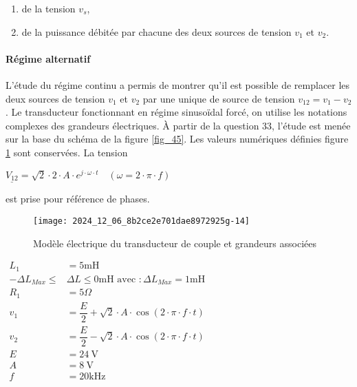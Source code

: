\begin{enumerate}
  \item de la tension \(v_{s}\),
  \item de la puissance débitée par chacune des deux sources de tension \(v_{1}\) et \(v_{2}\).
\end{enumerate}
\ifprof
\begin{corrige}

\end{corrige}
\else
\fi

\paragraph*{Régime alternatif} L'étude du régime continu a permis de montrer qu'il est possible de remplacer les deux sources de tension \(v_{1}\) et \(v_{2}\) par une unique de source de tension \(v_{12}=v_{1}-v_{2}\). Le transducteur fonctionnant en régime sinusoïdal forcé, on utilise les notations complexes des grandeurs électriques. À partir de la question 33, l'étude est menée sur la base du schéma de la figure \ref{fig_45}. Les valeurs numériques définies figure \ref{fig_44} sont conservées. La tension

$
\underline{V_{12}}=\sqrt{2} \cdot 2 \cdot A \cdot e^{j \cdot \omega \cdot t} \quad(\omega=2 \cdot \pi \cdot f)
$

est prise pour référence de phases.\\

\begin{figure}[!htb]
\begin{center}
\texttt{[image: 2024\_12\_06\_8b2ce2e701dae8972925g-14]}
\caption{ Modèle électrique du transducteur de couple et grandeurs associées \label{fig_44}}
\end{center}
\end{figure}

$
\begin{aligned}
L_{1} & =5 \mathrm{mH} \\
-\Delta L_{M a x} \leq & \Delta L \leq 0 \mathrm{mH} \text { avec }: \Delta L_{M a x}=1 \mathrm{mH} \\
R_{1} & =5 \Omega \\
v_{1} & =\dfrac{E}{2}+\sqrt{2} \cdot A \cdot \cos (2 \cdot \pi \cdot f \cdot t) \\
v_{2} & =\dfrac{E}{2}-\sqrt{2} \cdot A \cdot \cos (2 \cdot \pi \cdot f \cdot t) \\
E & =24 \mathrm{~V} \\
A & =8 \mathrm{~V} \\
f & =20 \mathrm{kHz}
\end{aligned}
$

